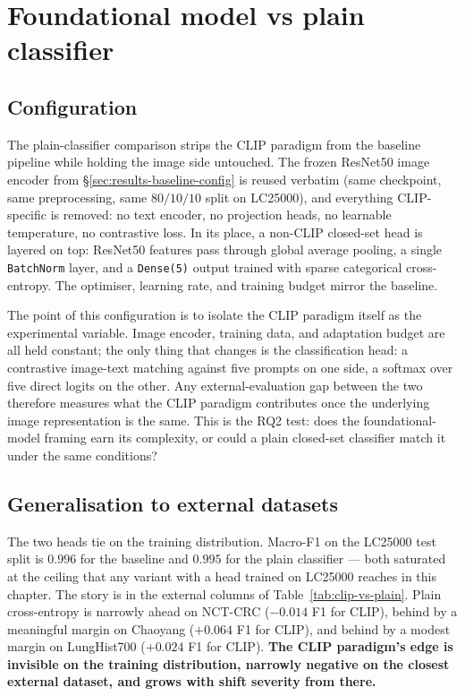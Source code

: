 \FloatBarrier
\section{Foundational model vs plain classifier}
\label{sec:results-foundational-vs-plain}

\subsection{Configuration}

The plain-classifier comparison strips the CLIP paradigm from the baseline pipeline while holding the image side untouched. The frozen ResNet50 image encoder from §\ref{sec:results-baseline-config} is reused verbatim (same checkpoint, same preprocessing, same $80/10/10$ split on LC25000), and everything CLIP-specific is removed: no text encoder, no projection heads, no learnable temperature, no contrastive loss. In its place, a non-CLIP closed-set head is layered on top: ResNet50 features pass through global average pooling, a single \texttt{BatchNorm} layer, and a \texttt{Dense(5)} output trained with sparse categorical cross-entropy. The optimiser, learning rate, and training budget mirror the baseline.

The point of this configuration is to isolate the CLIP paradigm itself as the experimental variable. Image encoder, training data, and adaptation budget are all held constant; the only thing that changes is the classification head: a contrastive image-text matching against five prompts on one side, a softmax over five direct logits on the other. Any external-evaluation gap between the two therefore measures what the CLIP paradigm contributes once the underlying image representation is the same. This is the RQ2 test: does the foundational-model framing earn its complexity, or could a plain closed-set classifier match it under the same conditions?


\subsection{Generalisation to external datasets}

The two heads tie on the training distribution. Macro-F1 on the LC25000 test split is $0.996$ for the baseline and $0.995$ for the plain classifier --- both saturated at the ceiling that any variant with a head trained on LC25000 reaches in this chapter. The story is in the external columns of Table~\ref{tab:clip-vs-plain}. Plain cross-entropy is narrowly ahead on NCT-CRC ($-0.014$ F1 for CLIP), behind by a meaningful margin on Chaoyang ($+0.064$ F1 for CLIP), and behind by a modest margin on LungHist700 ($+0.024$ F1 for CLIP). \textbf{The CLIP paradigm's edge is invisible on the training distribution, narrowly negative on the closest external dataset, and grows with shift severity from there.}

